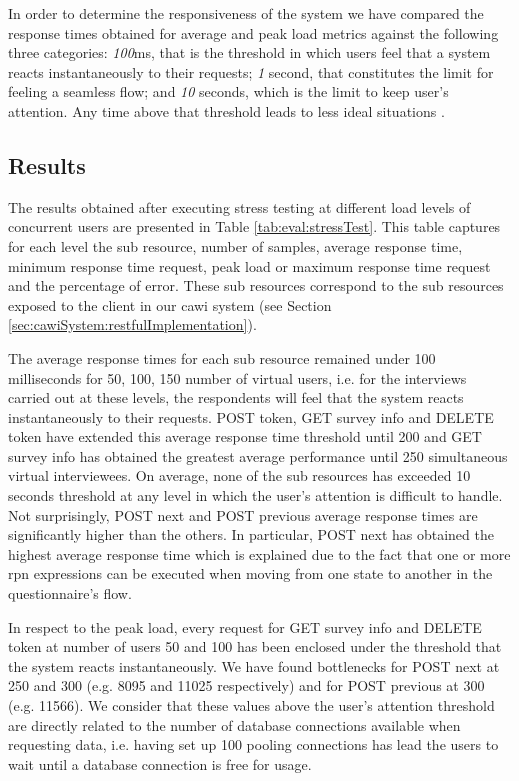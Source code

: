 	In order to determine the responsiveness of the system we have compared the response times obtained for average and peak load metrics against the following three categories: \emph{100}ms, that is the threshold in which users feel that a system reacts instantaneously to their requests; \emph{1} second, that constitutes the limit for feeling a seamless flow; and \emph{10} seconds, which is the limit to keep user's attention. Any time above that threshold leads to less ideal situations \cite{web:nielsen10}.

	\subsection{Results}

	The results obtained after executing stress testing at different load levels of concurrent users are presented in Table \ref{tab:eval:stressTest}. This table captures for each level the sub resource, number of samples, average response time, minimum response time request, peak load or maximum response time request and the percentage of error. These sub resources correspond to the sub resources exposed to the client in our \gls{cawi} system (see Section \ref{sec:cawiSystem:restfulImplementation}).

	The average response times for each sub resource remained under 100 milliseconds for 50, 100, 150 number of virtual users, i.e. for the interviews carried out at these levels, the respondents will feel that the system reacts instantaneously to their requests. POST token, GET survey info and DELETE token have extended this average response time threshold until 200 and GET survey info has obtained the greatest average performance until 250 simultaneous virtual interviewees. On average, none of the sub resources has exceeded 10 seconds threshold at any level in which the user's attention is difficult to handle. Not surprisingly, POST next and POST previous average response times are significantly higher than the others. In particular, POST next has obtained the highest average response time which is explained due to the fact that one or more \gls{rpn} expressions can be executed when moving from one state to another in the questionnaire's flow.
	
	In respect to the peak load, every request for GET survey info and DELETE token at number of users 50 and 100 has been enclosed under the threshold that the system reacts instantaneously. We have found bottlenecks for POST next at 250 and 300 (e.g. 8095 and 11025 respectively) and for POST previous at 300 (e.g. 11566). We consider that these values above the user's attention threshold are directly related to the number of database connections available when requesting data, i.e. having set up 100 pooling connections has lead the users to wait until a database connection is free for usage.

